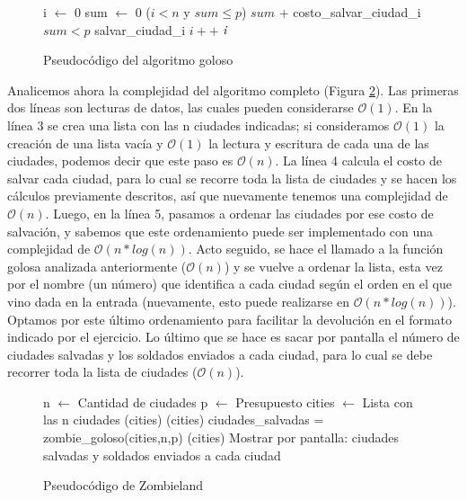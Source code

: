 \begin{figure}[!ht]
\begin{codebox}
\li i $\leftarrow$ 0
\li sum $\leftarrow$ 0
\li \While ($i<n$ y $sum \leq p$) 
\li 		\Do   
		$sum$ + costo_salvar_ciudad_i   
\li		\If $sum<p$
\li 			\Then salvar_ciudad_i
\li				$i++$
			\End
	\End
\li \Return $\id{i}$       
\end{codebox} 
\caption{Pseudocódigo del algoritmo goloso}\label{code:goloso}
\end{figure}
\FloatBarrier

Analicemos ahora la complejidad del algoritmo completo (Figura \ref{code:zombieland}). Las primeras dos líneas son lecturas de datos, las cuales pueden considerarse $\mathcal{O}(1)$.  En la línea 3 se crea una lista con las n ciudades indicadas; si consideramos $\mathcal{O}(1)$ la creación de una lista vacía y $\mathcal{O}(1)$ la lectura y escritura de cada una de las ciudades, podemos decir que este paso es $\mathcal{O}(n)$.  La línea 4 calcula el costo de salvar cada ciudad, para lo cual se recorre toda la lista de ciudades y se hacen los cálculos previamente descritos, así que nuevamente tenemos una complejidad de $\mathcal{O}(n)$.  Luego, en la línea 5, pasamos a ordenar las ciudades por ese costo de salvación, y sabemos que este ordenamiento puede ser implementado con una complejidad de $\mathcal{O}(n*log(n))$. Acto seguido, se hace el llamado a la función golosa analizada anteriormente ($\mathcal{O}(n)$) y se vuelve a ordenar la lista, esta vez por el nombre (un número) que identifica a cada ciudad según el orden en el que vino dada en la entrada (nuevamente, esto puede realizarse en $\mathcal{O}(n*log(n))$). Optamos por este último ordenamiento para facilitar la devolución en el formato indicado por el ejercicio.  Lo último que se hace es sacar por pantalla el número de ciudades salvadas y los soldados enviados a cada ciudad, para lo cual se debe recorrer toda la lista de ciudades ($\mathcal{O}(n)$).

\begin{figure}[!ht]
\begin{codebox}
\li n $\leftarrow$ Cantidad de ciudades
\li p $\leftarrow$ Presupuesto
\li cities $\leftarrow$ Lista con las n ciudades
(cities)
(cities)
\li ciudades_salvadas = {\sc zombie_goloso}(cities,n,p)
(cities)
\li Mostrar por pantalla: ciudades salvadas y soldados enviados a cada ciudad
\end{codebox}
\caption{Pseudocódigo de Zombieland}\label{code:zombieland}
\end{figure}
\FloatBarrier

